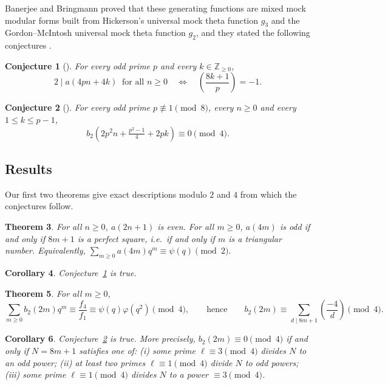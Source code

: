 \documentclass[11pt]{amsart}
\newtheorem{theorem}{Theorem}[section]
\newtheorem{corollary}[theorem]{Corollary}
\newtheorem{conjecture}[theorem]{Conjecture}
\theoremstyle{definition}
\theoremstyle{remark}
\numberwithin{equation}{section}
\newcommand{\Z}{\mathbb{Z}}
\begin{document}
Banerjee and Bringmann proved that these generating functions are mixed mock modular forms built from Hickerson's universal mock theta function $g_3$ and the Gordon--McIntosh universal mock theta function $g_2$, and they stated the following conjectures \cite[\S4]{BB}.

\begin{conjecture}[{\cite[Conj.~4.1]{BB}}]\label{conj:41}
For every odd prime $p$ and every $k\in\Z_{\ge0}$,
\[
2\mid a(4pn+4k)\ \text{ for all } n\ge 0\quad\Longleftrightarrow\quad \left(\frac{8k+1}{p}\right)=-1 .
\]
\end{conjecture}

\begin{conjecture}[{\cite[Conj.~4.2]{BB}}]\label{conj:42}
For every odd prime $p\not\equiv1\pmod 8$, every $n\ge0$ and every $1\le k\le p-1$,
\[
b_2\!\left(2p^2n+\tfrac{p^2-1}{4}+2pk\right)\equiv 0\pmod 4 .
\]
\end{conjecture}

\subsection{Results}
Our first two theorems give exact descriptions modulo $2$ and $4$ from which the conjectures follow.

\begin{theorem}\label{thm:A}
For all $n\ge0$, $a(2n+1)$ is even. For all $m\ge0$, $a(4m)$ is odd if and only if $8m+1$ is a perfect square, i.e.\ if and only if $m$ is a triangular number. Equivalently, $\sum_{m\ge0}a(4m)q^m\equiv\psi(q)\pmod 2$.
\end{theorem}

\begin{corollary}\label{cor:41}
Conjecture~\ref{conj:41} is true.
\end{corollary}

\begin{theorem}\label{thm:B}
For all $m\ge0$,
\[
\sum_{m\ge0}b_2(2m)q^m\equiv\frac{f_4}{f_1}\equiv\psi(q)\varphi(q^2)\pmod 4,
\qquad\text{hence}\qquad
b_2(2m)\equiv\sum_{d\mid 8m+1}\left(\frac{-4}{d}\right)\pmod 4 .
\]
\end{theorem}

\begin{corollary}\label{cor:42}
Conjecture~\ref{conj:42} is true. More precisely, $b_2(2m)\equiv0\pmod 4$ if and only if $N=8m+1$ satisfies one of: \textup{(i)} some prime $\ell\equiv3\pmod4$ divides $N$ to an odd power; \textup{(ii)} at least two primes $\ell\equiv1\pmod4$ divide $N$ to odd powers; \textup{(iii)} some prime $\ell\equiv1\pmod4$ divides $N$ to a power $\equiv3\pmod 4$.
\end{corollary}
\end{document}
